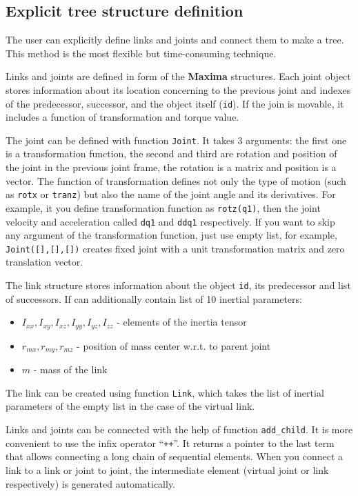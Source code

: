\documentclass{article}
\begin{document}
\subsection{Explicit tree structure definition} 

The user can explicitly define links and joints and connect them to make a tree. This method is the most flexible but time-consuming technique.  

Links and joints are defined in form of the \textbf{Maxima} structures. Each joint object stores information about its location concerning to the previous joint and indexes of the predecessor, successor, and the object itself (\texttt{id}). If the join is movable, it includes a function of transformation and torque value.  

The joint can be defined with function \texttt{Joint}. It takes 3 arguments: the first one is a transformation function, the second and third are rotation and position of the joint in the previous joint frame, the rotation is a matrix and position is a vector. 
The function of transformation defines not only the type of motion (such as \texttt{rotx} or \texttt{tranz}) but also the name of the joint angle and its derivatives. For example, it you define transformation function as \texttt{rotz(q1)}, then the joint velocity and acceleration called \texttt{dq1} and \texttt{ddq1} respectively. If you want to skip any argument of the transformation function, just use empty list, for example, \texttt{Joint([],[],[])} creates fixed joint with a unit transformation matrix and zero translation vector. 

The link structure stores information about the object \texttt{id}, its predecessor and list of successors. If can additionally contain list of 10 inertial parameters:
\begin{itemize}
    \item $I_{xx}, I_{xy}, I_{xz}, I_{yy}, I_{yz}, I_{zz}$ - elements of the inertia tensor 
    \item $r_{mx}, r_{my}, r_{mz}$ - position of mass center w.r.t. to parent joint
    \item $m$ - mass of the link
\end{itemize}
The link can be created using function \texttt{Link}, which takes the list of inertial parameters of the empty list in the case of the virtual link. 

Links and joints can be connected with the help of function \texttt{add\_child}. It is more convenient to use the infix operator ``\texttt{++}''. It returns a pointer to the last term that allows connecting a long chain of sequential elements. When you connect a link to a link or joint to joint, the intermediate element (virtual joint or link respectively) is generated automatically.  
\end{document}
